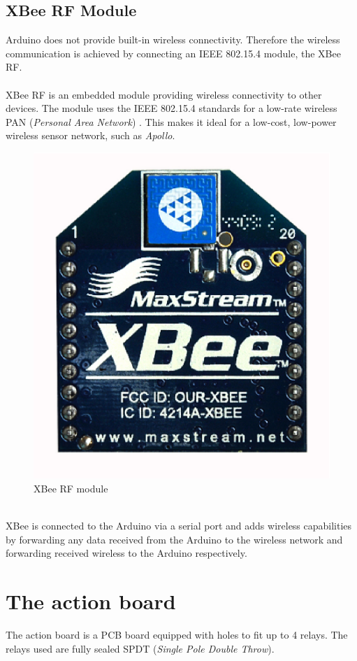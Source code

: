 \documentclass[12pt,a4paper]{report}
\begin{document}
\subsection{XBee RF Module}
Arduino does not provide built-in wireless connectivity. Therefore the wireless communication is achieved by connecting an IEEE 802.15.4 module, the XBee RF. \\
\ \\
XBee RF is an embedded module providing wireless connectivity to other devices. The module uses the IEEE 802.15.4 standards for a low-rate wireless PAN (\textit{Personal Area Network}) \cite{website:xbee}. This makes it ideal for a low-cost, low-power wireless sensor network, such as \emph{Apollo}.
\begin{figure}[H]
    \centering
    \includegraphics*[scale=0.25]{xbee}
    \caption{XBee RF module}
\end{figure}
\ \\
XBee is connected to the Arduino via a serial port and adds wireless capabilities by forwarding any data received from the Arduino to the wireless network and forwarding received wireless to the Arduino respectively.
%
\section{The action board}
The action board is a PCB board equipped with holes to fit up to 4 relays. The relays used are fully sealed SPDT (\textit{Single Pole Double Throw}). \\
\ \\
%
\end{document}
